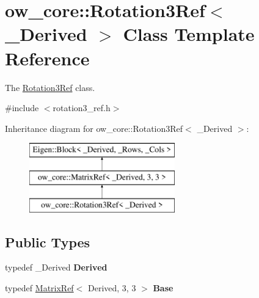 \hypertarget{classow__core_1_1Rotation3Ref}{}\section{ow\+\_\+core\+:\+:Rotation3\+Ref$<$ \+\_\+\+Derived $>$ Class Template Reference}
\label{classow__core_1_1Rotation3Ref}


The \hyperlink{classow__core_1_1Rotation3Ref}{Rotation3\+Ref} class.  




{\ttfamily \#include $<$rotation3\+\_\+ref.\+h$>$}

Inheritance diagram for ow\+\_\+core\+:\+:Rotation3\+Ref$<$ \+\_\+\+Derived $>$\+:\begin{figure}[H]
\begin{center}
\leavevmode
\includegraphics[height=3.000000cm]{dd/d45/classow__core_1_1Rotation3Ref}
\end{center}
\end{figure}
\subsection*{Public Types}
\begin{DoxyCompactItemize}
\item 
typedef \+\_\+\+Derived {\bfseries Derived}\hypertarget{classow__core_1_1Rotation3Ref_a1997d14d4c8143247e57d9543375f613}{}\label{classow__core_1_1Rotation3Ref_a1997d14d4c8143247e57d9543375f613}

\item 
typedef \hyperlink{classow__core_1_1MatrixRef}{Matrix\+Ref}$<$ Derived, 3, 3 $>$ {\bfseries Base}\hypertarget{classow__core_1_1Rotation3Ref_a607f0e4b50d0a3b33152979f6b0fc6f9}{}\label{classow__core_1_1Rotation3Ref_a607f0e4b50d0a3b33152979f6b0fc6f9}

\end{DoxyCompactItemize}
